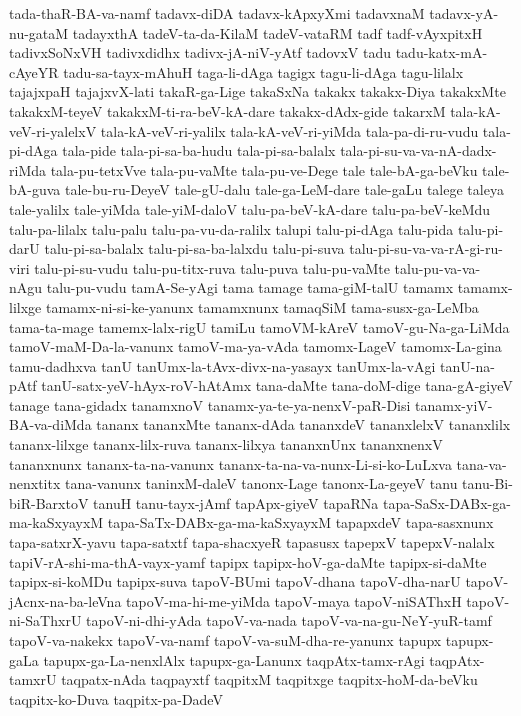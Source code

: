 {tada-thaR-BA-va-namf
tadavx-diDA
tadavx-kApxyXmi
tadavxnaM
tadavx-yA-nu-gataM
tadayxthA
tadeV-ta-da-KilaM
tadeV-vataRM
tadf
tadf-vAyxpitxH
tadivxSoNxVH
tadivxdidhx
tadivx-jA-niV-yAtf
tadovxV
tadu
tadu-katx-mA-cAyeYR
tadu-sa-tayx-mAhuH
taga-li-dAga
tagigx
tagu-li-dAga
tagu-lilalx
tajajxpaH
tajajxvX-lati
takaR-ga-Lige
takaSxNa
takakx
takakx-Diya
takakxMte
takakxM-teyeV
takakxM-ti-ra-beV-kA-dare
takakx-dAdx-gide
takarxM
tala-kA-veV-ri-yalelxV
tala-kA-veV-ri-yalilx
tala-kA-veV-ri-yiMda
tala-pa-di-ru-vudu
tala-pi-dAga
tala-pide
tala-pi-sa-ba-hudu
tala-pi-sa-balalx
tala-pi-su-va-va-nA-dadx-riMda
tala-pu-tetxVve
tala-pu-vaMte
tala-pu-ve-Dege
tale
tale-bA-ga-beVku
tale-bA-guva
tale-bu-ru-DeyeV
tale-gU-dalu
tale-ga-LeM-dare
tale-gaLu
talege
taleya
tale-yalilx
tale-yiMda
tale-yiM-daloV
talu-pa-beV-kA-dare
talu-pa-beV-keMdu
talu-pa-lilalx
talu-palu
talu-pa-vu-da-ralilx
talupi
talu-pi-dAga
talu-pida
talu-pi-darU
talu-pi-sa-balalx
talu-pi-sa-ba-lalxdu
talu-pi-suva
talu-pi-su-va-va-rA-gi-ru-viri
talu-pi-su-vudu
talu-pu-titx-ruva
talu-puva
talu-pu-vaMte
talu-pu-va-va-nAgu
talu-pu-vudu
tamA-Se-yAgi
tama
tamage
tama-giM-talU
tamamx
tamamx-lilxge
tamamx-ni-si-ke-yanunx
tamamxnunx
tamaqSiM
tama-susx-ga-LeMba
tama-ta-mage
tamemx-lalx-rigU
tamiLu
tamoVM-kAreV
tamoV-gu-Na-ga-LiMda
tamoV-maM-Da-la-vanunx
tamoV-ma-ya-vAda
tamomx-LageV
tamomx-La-gina
tamu-dadhxva
tanU
tanUmx-la-tAvx-divx-na-yasayx
tanUmx-la-vAgi
tanU-na-pAtf
tanU-satx-yeV-hAyx-roV-hAtAmx
tana-daMte
tana-doM-dige
tana-gA-giyeV
tanage
tana-gidadx
tanamxnoV
tanamx-ya-te-ya-nenxV-paR-Disi
tanamx-yiV-BA-va-diMda
tananx
tananxMte
tananx-dAda
tananxdeV
tananxlelxV
tananxlilx
tananx-lilxge
tananx-lilx-ruva
tananx-lilxya
tananxnUnx
tananxnenxV
tananxnunx
tananx-ta-na-vanunx
tananx-ta-na-va-nunx-Li-si-ko-LuLxva
tana-va-nenxtitx
tana-vanunx
taninxM-daleV
tanonx-Lage
tanonx-La-geyeV
tanu
tanu-Bi-biR-BarxtoV
tanuH
tanu-tayx-jAmf
tapApx-giyeV
tapaRNa
tapa-SaSx-DABx-ga-ma-kaSxyayxM
tapa-SaTx-DABx-ga-ma-kaSxyayxM
tapapxdeV
tapa-sasxnunx
tapa-satxrX-yavu
tapa-satxtf
tapa-shacxyeR
tapasusx
tapepxV
tapepxV-nalalx
tapiV-rA-shi-ma-thA-vayx-yamf
tapipx
tapipx-hoV-ga-daMte
tapipx-si-daMte
tapipx-si-koMDu
tapipx-suva
tapoV-BUmi
tapoV-dhana
tapoV-dha-narU
tapoV-jAcnx-na-ba-leVna
tapoV-ma-hi-me-yiMda
tapoV-maya
tapoV-niSAThxH
tapoV-ni-SaThxrU
tapoV-ni-dhi-yAda
tapoV-va-nada
tapoV-va-na-gu-NeY-yuR-tamf
tapoV-va-nakekx
tapoV-va-namf
tapoV-va-suM-dha-re-yanunx
tapupx
tapupx-gaLa
tapupx-ga-La-nenxlAlx
tapupx-ga-Lanunx
taqpAtx-tamx-rAgi
taqpAtx-tamxrU
taqpatx-nAda
taqpayxtf
taqpitxM
taqpitxge
taqpitx-hoM-da-beVku
taqpitx-ko-Duva
taqpitx-pa-DadeV
}
